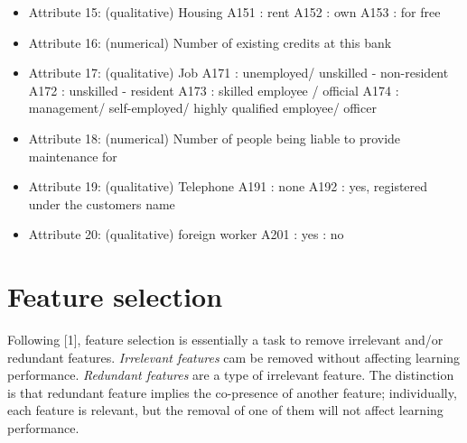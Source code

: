 \documentclass[10pt]{article}\usepackage[]{graphicx}\usepackage[]{color}
\begin{document}
\begin{itemize}
\item Attribute 15: (qualitative) Housing 
\newline A151 : rent 
\newline A152 : own 
\newline A153 : for free 

\item Attribute 16: (numerical) Number of existing credits at this bank 

\item Attribute 17: (qualitative) Job 
\newline A171 : unemployed/ unskilled - non-resident 
\newline A172 : unskilled - resident 
\newline A173 : skilled employee / official 
\newline A174 : management/ self-employed/ highly qualified employee/ officer 

\item Attribute 18: (numerical) Number of people being liable to provide maintenance for 

\item Attribute 19: (qualitative) Telephone 
\newline A191 : none 
\newline A192 : yes, registered under the customers name 

\item Attribute 20: (qualitative) foreign worker 
\newline A201 : yes 
 : no 
\end{itemize}






\clearpage
\section{Feature selection}
Following [1], feature selection is essentially a task to remove irrelevant and/or redundant features. \textit{Irrelevant features} cam be removed without affecting learning performance. \textit{Redundant features} are a type of irrelevant feature. The distinction is that redundant feature implies the co-presence of another feature; individually, each feature is relevant, but the removal of one of them will not affect learning performance. 
\end{document}
